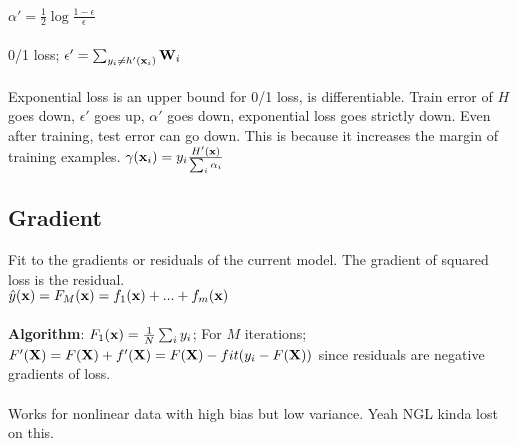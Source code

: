 $\alpha' = \frac{1}{2}\log \frac{1-\epsilon}{\epsilon}$\\\\
0/1 loss; $\epsilon' = \sum_{y_i \neq h'({\textrm{\textbf{x}}}_i)}{\textrm{\textbf{W}}}_i$\\\\
Exponential loss is an upper bound for 0/1 loss, is differentiable. Train error of $H$ goes down, $\epsilon'$ goes up, $\alpha'$ goes down, exponential loss goes strictly down. Even after training, test error can go down. This is because it increases the margin of training examples. $\gamma({\textrm{\textbf{x}}}_i) = y_i \frac{H'({\textrm{\textbf{x}}})}{\sum_i \alpha_i}$\\

\subsection{Gradient}
Fit to the gradients or residuals of the current model. The gradient of squared loss is the residual.\\
$\hat{y}({\textrm{\textbf{x}}}) = F_M({\textrm{\textbf{x}}}) = f_1({\textrm{\textbf{x}}}) + ... + f_m({\textrm{\textbf{x}}})$\\\\
\textbf{Algorithm}: $F_1({\textrm{\textbf{x}}}) = \frac{1}{N}\sum_i y_i$; For $M$ iterations; $F'({\textrm{\textbf{X}}}) = F({\textrm{\textbf{X}}}) + f'({\textrm{\textbf{X}}}) = F({\textrm{\textbf{X}}}) - fit(y_i - F({\textrm{\textbf{X}}}))$ since residuals are negative gradients of loss.\\\\
Works for nonlinear data with high bias but low variance. Yeah NGL kinda lost on this.